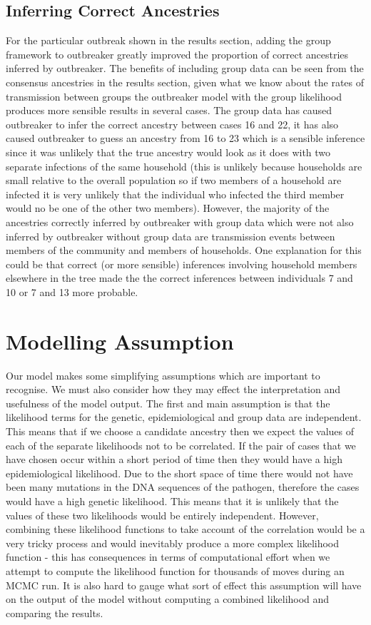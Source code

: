\documentclass[11pt,a4paper]{report}
\begin{document}
\subsection{Inferring Correct Ancestries}
For the particular outbreak shown in the results section, adding the group framework to outbreaker greatly improved the proportion of correct ancestries inferred by outbreaker. The benefits of including group data can be seen from the consensus ancestries in the results section, given what we know about the rates of transmission between groups the outbreaker model with the group likelihood produces more sensible results in several cases. The group data has caused outbreaker to infer the correct ancestry between cases 16 and 22, it has also caused outbreaker to guess an ancestry from 16 to 23 which is a sensible inference since it was unlikely that the true ancestry would look as it does with two separate infections of the same household (this is unlikely because households are small relative to the overall population so if two members of a household are infected it is very unlikely that the individual who infected the third member would no be one of the other two members). However, the majority of the ancestries correctly inferred by outbreaker with group data which were not also inferred by outbreaker without group data are transmission events between members of the community and members of households. One explanation for this could be that correct (or more sensible) inferences involving household members elsewhere in the tree made the the correct inferences between individuals 7 and 10 or 7 and 13 more probable.  

\section{Modelling Assumption}
Our model makes some simplifying assumptions which are important to recognise. We must also consider how they may effect the interpretation and usefulness of the model output. The first and main assumption is that the likelihood terms for the genetic, epidemiological and group data are independent. This means that if we choose a candidate ancestry then we expect the values of each of the separate likelihoods not to be correlated. If the pair of cases that we have chosen occur within a short period of time then they would have a high epidemiological likelihood. Due to the short space of time there would not have been many mutations in the DNA sequences of the pathogen, therefore the cases would have a high genetic likelihood. This means that it is unlikely that the values of these two likelihoods would be entirely independent. However, combining these likelihood functions to take account of the correlation would be a very tricky process and would inevitably produce a more complex likelihood function - this has consequences in terms of computational effort when we attempt to compute the likelihood function for thousands of moves during an MCMC run. It is also hard to gauge what sort of effect this assumption will have on the output of the model without computing a combined likelihood and comparing the results.
\end{document}
